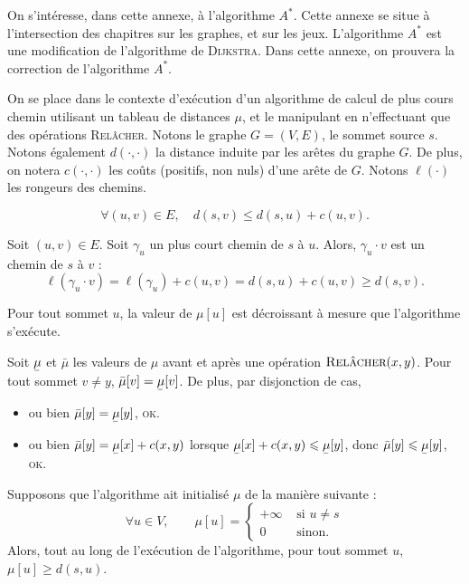 \documentclass[a4paper]{article}
\begin{document}
	On s'intéresse, dans cette annexe, à l'algorithme $A^*$.
	Cette annexe se situe à l'intersection des chapitres sur les graphes, et sur les jeux.
	L'algorithme $A^*$ est une modification de l'algorithme de \textsc{Dijkstra}.
	Dans cette annexe, on prouvera la correction de l'algorithme $A^*$.

	On se place dans le contexte d'exécution d'un algorithme de calcul de plus cours chemin utilisant un tableau de distances $\mu$, et le manipulant en n'effectuant que des opérations \textsc{Relâcher}.
	Notons le graphe $G = (V,E)$, le sommet source $s$.
	Notons également $d(\cdot,\cdot)$ la distance induite par les arêtes du graphe $G$.
	De plus, on notera $c(\cdot,\cdot)$ les coûts (positifs, non nuls) d'une arête de $G$.
	Notons $\ell(\cdot)$ les rongeurs des chemins.

	\begin{numlem}
		\[
			\forall (u,v) \in E,\quad d(s,v) \le d(s, u) + c(u,v)
		.\]
	\end{numlem}

	\begin{prv}
		Soit $(u,v) \in E$.
		Soit $\gamma_u$ un plus court chemin de $s$ à $u$.
		Alors, $\gamma_u \cdot v$ est un chemin de $s$ à $v$ :
		\[
			\ell(\gamma_u \cdot v) = \ell(\gamma_u) + c(u,v) = d(s,u) + c(u,v) \ge d(s,v).
		\]
	\end{prv}

	\begin{numlem}
		Pour tout sommet $u$, la valeur de $\mu[u]$ est décroissant à mesure que l'algorithme s'exécute.
	\end{numlem}

	\begin{prv}
		Soit $\ubar{\mu}$ et $\bar\mu$ les valeurs de $\mu$ avant et après une opération $\textsc{Relâcher}(x,y)$.
		Pour tout sommet $v \neq y$, $\bar\mu[v] = \ubar\mu[v]$.
		De plus, par disjonction de cas,
		\begin{itemize}
			\item ou bien $\bar\mu[y] = \ubar\mu[y]$, \textsc{ok}.
			\item ou bien $\bar\mu[y] = \ubar\mu[x] + c(x,y)$ lorsque $\ubar\mu[x] + c(x,y) \le \ubar\mu[y]$, donc $\bar\mu[y] \le \ubar\mu[y]$, \textsc{ok}.
		\end{itemize}
	\end{prv}

	\begin{numlem}
		Supposons que l'algorithme ait initialisé $\mu$ de la manière suivante : \[
			\forall u \in V,\quad\quad \mu[u] = \begin{cases}
				+\infty & \text{ si } u \neq s\\
				0 & \text{ sinon}.
			\end{cases}
		\] Alors, tout au long de l'exécution de l'algorithme, pour tout sommet $u$, $\mu[u] \ge d(s,u)$.
	\end{numlem}
\end{document}
